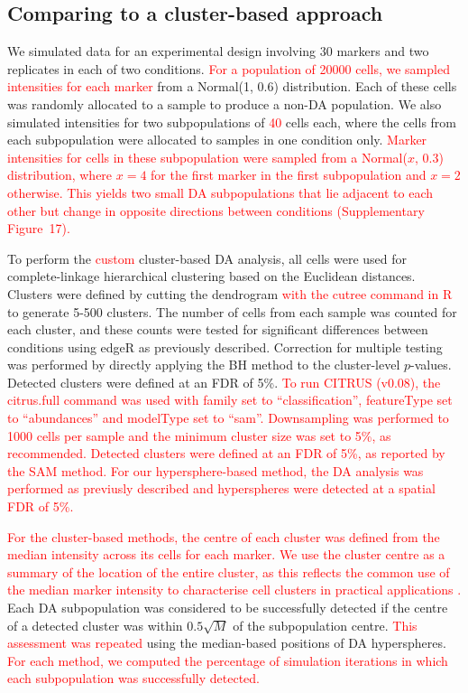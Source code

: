 \documentclass{article}
\newcommand\revised[1]{\textcolor{red}{#1}}
\newcommand{\suppfigclustersim}{17}
\begin{document}
\subsection{Comparing to a cluster-based approach}
We simulated data for an experimental design involving 30 markers and two replicates in each of two conditions.
\revised{For a population of 20000 cells, we sampled intensities for each marker} from a Normal(1, 0.6) distribution.
Each of these cells was randomly allocated to a sample to produce a non-DA population.
We also simulated intensities for two subpopulations of \revised{40} cells each, where the cells from each subpopulation were allocated to samples in one condition only.
\revised{Marker intensities for cells in these subpopulation were sampled from a Normal($x$, 0.3) distribution, where $x=4$ for the first marker in the first subpopulation and $x=2$ otherwise.
This yields two small DA subpopulations that lie adjacent to each other but change in opposite directions between conditions (Supplementary Figure~\suppfigclustersim{}).}

To perform the \revised{custom} cluster-based DA analysis, all cells were used for complete-linkage hierarchical clustering based on the Euclidean distances.
Clusters were defined by cutting the dendrogram \revised{with the cutree command in R} to generate 5-500 clusters.
The number of cells from each sample was counted for each cluster, and these counts were tested for significant differences between conditions using edgeR as previously described.
Correction for multiple testing was performed by directly applying the BH method to the cluster-level $p$-values.
Detected clusters were defined at an FDR of 5\%.
\revised{To run CITRUS (v0.08), the citrus.full command was used with family set to ``classification'', featureType set to ``abundances'' and modelType set to ``sam''.
Downsampling was performed to 1000 cells per sample and the minimum cluster size was set to 5\%, as recommended.
Detected clusters were defined at an FDR of 5\%, as reported by the SAM method.
For our hypersphere-based method, the DA analysis was performed as previusly described and hyperspheres were detected at a spatial FDR of 5\%.}

\revised{For the cluster-based methods, the centre of each cluster was defined from the median intensity across its cells for each marker.
We use the cluster centre as a summary of the location of the entire cluster, as this reflects the common use of the median marker intensity to characterise cell clusters in practical applications \cite{qiu2011extracting,bruggner2014automated}.}
Each DA subpopulation was considered to be successfully detected if the centre of a detected cluster was within $0.5\sqrt{M}$ of the subpopulation centre.
\revised{This assessment was repeated} using the median-based positions of DA hyperspheres.
\revised{For each method, we computed the percentage of simulation iterations in which each subpopulation was successfully detected.}
\end{document}
